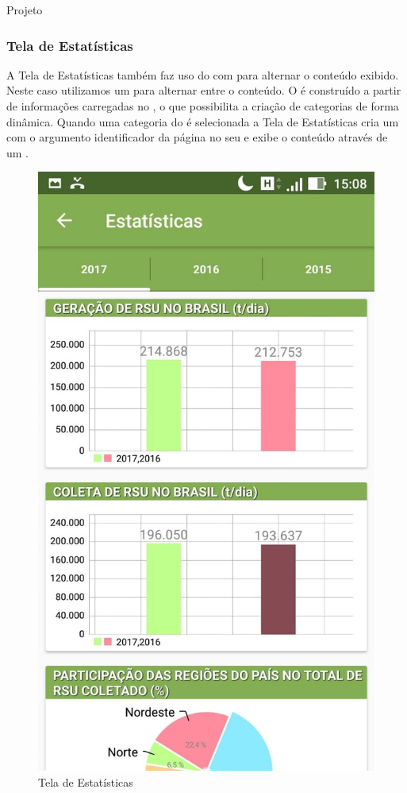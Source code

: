 \documentclass[
	12pt,				%
	openany,			%
	twoside,			%
	a4paper,			%
	english,			%
	french,				%
	spanish,			%
	brazil				%
	]{abntex2}
\begin{document}
\begin{chapter}{Projeto}
\subsubsection{Tela de Estatísticas}
\label{ActivityStatistics}
A Tela de Estatísticas também faz uso do  com  para alternar o conteúdo exibido. Neste caso utilizamos um  para alternar entre o conteúdo. O  é construído a partir de informações carregadas no , o que possibilita a criação de categorias de forma dinâmica. Quando uma categoria do  é selecionada a Tela de Estatísticas cria um  com o argumento identificador da página no seu  e exibe o conteúdo através de um .
  
    \begin{figure}[htb]    
 \centering
  \begin{minipage}{0.45\textwidth}
    \centering
    \caption{Tela de Estatísticas}
    \includegraphics[scale=0.35]{media/tela_stats_1.jpg}

\end{minipage}
\end{figure}
\end{chapter}
\end{document}
